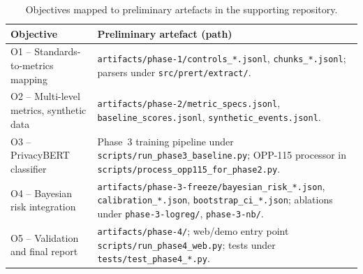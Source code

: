 \documentclass[12pt,a4paper,titlepage]{article}
\begin{document}
\begin{table}[hbt]
    \centering
    \caption{Objectives mapped to preliminary artefacts in the supporting repository.}
    \label{tab:artefacts}
    \small
    \begin{tabularx}{\linewidth}{@{}l X@{}}
        \toprule
        \textbf{Objective} & \textbf{Preliminary artefact (path)} \\
        \midrule
        O1 -- Standards-to-metrics mapping        & \texttt{artifacts/phase-1/controls\_*.jsonl}, \texttt{chunks\_*.jsonl}; parsers under \texttt{src/prert/extract/}. \\
        O2 -- Multi-level metrics, synthetic data & \texttt{artifacts/phase-2/metric\_specs.jsonl}, \texttt{baseline\_scores.jsonl}, \texttt{synthetic\_events.jsonl}. \\
        O3 -- PrivacyBERT classifier              & Phase~3 training pipeline under \texttt{scripts/run\_phase3\_baseline.py}; OPP-115 processor in \texttt{scripts/process\_opp115\_for\_phase2.py}. \\
        O4 -- Bayesian risk integration           & \texttt{artifacts/phase-3-freeze/bayesian\_risk\_*.json}, \texttt{calibration\_*.json}, \texttt{bootstrap\_ci\_*.json}; ablations under \texttt{phase-3-logreg/}, \texttt{phase-3-nb/}. \\
        O5 -- Validation and final report         & \texttt{artifacts/phase-4/}; web/demo entry point \texttt{scripts/run\_phase4\_web.py}; tests under \texttt{tests/test\_phase4\_*.py}. \\
        \bottomrule
    \end{tabularx}
\end{table}
\end{document}
